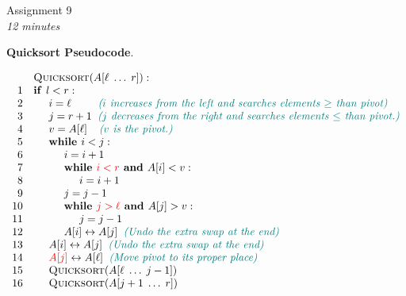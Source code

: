 \documentclass[a4paper,12pt]{article}
\begin{document}

\thispagestyle{empty}

\begin{center}
{\Large Assignment 9}\\
{\em 12 minutes} 
\end{center}

\noindent


\vspace{10pt}
{\bf Quicksort Pseudocode}. 

\[
\begin{array}{rl}
 & \text{\textsc{Quicksort}}(A[\ell\;\ldots\;r]):\\
1 & \text{\textbf{if\ }} l<r:\\
2 & \hspace{.5cm} i = \ell \;\;\;\;\;\;\;\;\; \textcolor{teal}{\text{\em ($i$ increases from the left and searches elements $\geq$ than pivot)}}\\
3 & \hspace{.5cm} j = r+1	\;\; \textcolor{teal}{\text{\em ($j$ decreases from the right and searches elements $\leq$ than pivot.)}}\\	
4 & \hspace{.5cm} v = A[\ell] \;\;\;\; \textcolor{teal}{\text{\em ($v$ is the pivot.)}}\\
5 & \hspace{.5cm} \text{\textbf{while\ }} i<j:\\
6 & \hspace{1.0cm} i = i+1\\
7 & \hspace{1.0cm} \text{\textbf{while\ }} \textcolor{red}{i<r} \text{\textbf{\ and\ }} A[i]<v:\\
8 & \hspace{1.5cm} i = i+1\\
9 & \hspace{1.0cm} j = j-1\\
10 & \hspace{1.0cm} \text{\textbf{while\ }} \textcolor{red}{j>\ell} \text{\textbf{\ and\ }} A[j]>v:\\
11 & \hspace{1.5cm} j = j-1\\
12 & \hspace{1.0cm} A[i] \leftrightarrow A[j] \;\; \textcolor{teal}{\text{\em (Undo the extra swap at the end)}}\\
13 & \hspace{0.5cm} A[i] \leftrightarrow A[j] \;\; \textcolor{teal}{\text{\em (Undo the extra swap at the end)}}\\
14 & \hspace{0.5cm} \textcolor{red}{A[j]} \leftrightarrow A[\ell] \;\; \textcolor{teal}{\text{\em (Move pivot to its proper place)}}\\
15 & \hspace{0.5cm} \text{\textsc{Quicksort}}(A[\ell\;\ldots\;j-1])\\
16 & \hspace{0.5cm} \text{\textsc{Quicksort}}(A[j+1\;\ldots\;r])\\
\end{array}
\]
\end{document}

